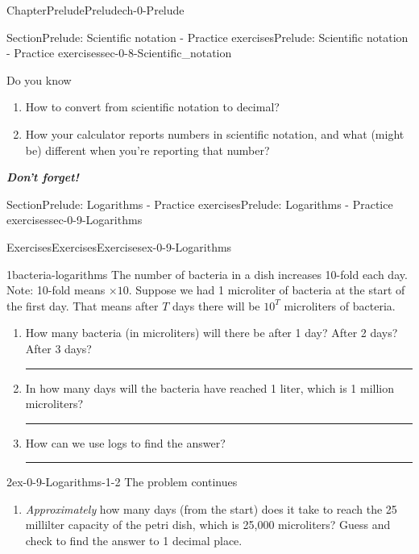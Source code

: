 \documentclass[twoside,11pt,]{book}
\newcommand{\alert}[1]{\textbf{\textit{#1}}}
\newlength{\workspacestrutwidth}
\numberwithin{equation}{section}
\begin{document}
\begin{chapterptx}{Chapter}{Prelude}{}{Prelude}{}{}{ch-0-Prelude}
\begin{sectionptx}{Section}{Prelude: Scientific notation - Practice exercises}{}{Prelude: Scientific notation - Practice exercises}{}{}{sec-0-8-Scientific_notation}
\begin{conclusion}{Do you know \textellipsis{}}
\begin{enumerate}[label={\Alph*.}]
\item{}How to convert from scientific notation to decimal?%
\item{}How your calculator reports numbers in scientific notation, and what (might be) different when you're reporting that number?%
\end{enumerate}
%
\par
\alert{Don't forget!}%
\end{conclusion}%
\end{sectionptx}
%
%
\typeout{************************************************}
\typeout{************************************************}
%
\begin{sectionptx}{Section}{Prelude: Logarithms - Practice exercises}{}{Prelude: Logarithms - Practice exercises}{}{}{sec-0-9-Logarithms}
%
%
\typeout{************************************************}
\typeout{************************************************}
%
\begin{exercises-subsection-numberless}{Exercises}{Exercises}{}{Exercises}{}{}{ex-0-9-Logarithms}
\begin{divisionexercise}{1}{}{}{bacteria-logarithms}%
The number of bacteria in a dish increases 10-fold each day. Note: 10-fold means \(\times 10\). Suppose we had 1 microliter of bacteria at the start of the first day. That means after \(T\) days there will be \(10^T\) microliters of bacteria.%
\begin{enumerate}[label=(\alph*),ref=\alph*]%
\item{}How many bacteria (in microliters) will there be after 1 day? After 2 days? After 3 days?%
\par\rule{\workspacestrutwidth}{0.6in}%
\item{}In how many days will the bacteria have reached 1 liter, which is 1 million microliters?%
\par\rule{\workspacestrutwidth}{0.6in}%
\item{}How can we use logs to find the answer?%
\par\rule{\workspacestrutwidth}{0.6in}%
\end{enumerate}%
\end{divisionexercise}%
 \begin{divisionexercise}{2}{}{}{ex-0-9-Logarithms-1-2}%
The problem continues \textellipsis{}%
\begin{enumerate}[label=(\alph*),ref=\alph*]%
\item{}\emph{Approximately} how many days (from the start) does it take to reach the 25 millilter capacity of the petri dish, which is 25,000 microliters? Guess and check to find the answer to 1 decimal place.%

\end{enumerate}
\end{divisionexercise}
\end{exercises-subsection-numberless}
\end{sectionptx}
\end{chapterptx}
\end{document}
